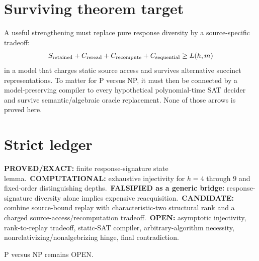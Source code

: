 \documentclass[11pt]{article}\usepackage[margin=.88in]{geometry}\usepackage{amsmath,amssymb,booktabs}
\begin{document}
\section*{Surviving theorem target}
A useful strengthening must replace pure response diversity by a source-specific tradeoff:
\[
S_{\rm retained}+C_{\rm reread}+C_{\rm recompute}+C_{\rm sequential}\ge L(h,m)
\]
in a model that charges static source access and survives alternative succinct representations. To matter for P versus NP, it must then be connected by a model-preserving compiler to every hypothetical polynomial-time SAT decider and survive semantic/algebraic oracle replacement. None of those arrows is proved here.

\section*{Strict ledger}
\textbf{PROVED/EXACT:} finite response-signature state lemma.\
\textbf{COMPUTATIONAL:} exhaustive injectivity for $h=4$ through $9$ and fixed-order distinguishing depths.\
\textbf{FALSIFIED as a generic bridge:} response-signature diversity alone implies expensive reacquisition.\
\textbf{CANDIDATE:} combine source-bound replay with characteristic-two structural rank and a charged source-access/recomputation tradeoff.\
\textbf{OPEN:} asymptotic injectivity, rank-to-replay tradeoff, static-SAT compiler, arbitrary-algorithm necessity, nonrelativizing/nonalgebrizing hinge, final contradiction.

P versus NP remains OPEN.
\end{document}
